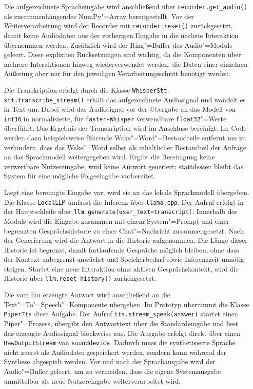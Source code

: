 Die aufgezeichnete Spracheingabe wird anschließend über \texttt{recorder.get\_audio()} als zusammenhängendes NumPy"=Array bereitgestellt. Vor der Weiterverarbeitung wird der Recorder mit \texttt{recorder.reset()} zurückgesetzt, damit keine Audiodaten aus der vorherigen Eingabe in die nächste Interaktion übernommen werden. Zusätzlich wird der Ring"=Buffer des Audio"=Moduls geleert. Diese expliziten Rücksetzungen sind wichtig, da die Komponenten über mehrere Interaktionen hinweg wiederverwendet werden, die Daten einer einzelnen Äußerung aber nur für den jeweiligen Verarbeitungsschritt benötigt werden.

Die Transkription erfolgt durch die Klasse \texttt{WhisperStt}. \texttt{stt.transcribe\_stream()} erhält das aufgezeichnete Audiosignal und wandelt es in Text um. Dabei wird das Audiosignal vor der Übergabe an das Modell von \texttt{int16} in normalisierte, für \texttt{faster-Whisper} verwendbare \texttt{float32}"=Werte überführt. Das Ergebnis der Transkription wird im Anschluss bereinigt. Im Code werden dazu beispielsweise führende Wake"=Word"=Bestandteile entfernt um zu verhindern, dass das Wake"=Word selbst als inhaltlicher Bestandteil der Anfrage an das Sprachmodell weitergegeben wird. Ergibt die Bereinigung keine verwertbare Nutzereingabe, wird keine Antwort generiert; stattdessen bleibt das System für eine mögliche Folgeeingabe vorbereitet.

Liegt eine bereinigte Eingabe vor, wird sie an das lokale Sprachmodell übergeben. Die Klasse \texttt{LocalLLM} umfasst die Inferenz über \texttt{llama.cpp}. Der Aufruf erfolgt in der Hauptschleife über \texttt{llm.generate(user\_text=transcript)}. Innerhalb des Moduls wird die Eingabe zusammen mit einem System"=Prompt und einer begrenzten Gesprächshistorie zu einer Chat"=Nachricht zusammengesetzt. Nach der Generierung wird die Antwort in die Historie aufgenommen. Die Länge dieser Historie ist begrenzt, damit fortlaufende Gespräche möglich bleiben, ohne dass der Kontext unbegrenzt anwächst und Speicherbedarf sowie Inferenzzeit unnötig steigen. Startet eine neue Interaktion ohne aktiven Gesprächskontext, wird die Historie über \texttt{llm.reset\_history()} zurückgesetzt.

Die vom \gls{llm} erzeugte Antwort wird anschließend an die Text"=To"=Speech"=Komponente übergeben. Im Prototyp übernimmt die Klasse \texttt{PiperTts} diese Aufgabe. Der Aufruf \texttt{tts.stream\_speak(answer)} startet einen Piper"=Prozess, übergibt den Antworttext über die Standardeingabe und liest das erzeugte Audiosignal blockweise aus. Die Ausgabe erfolgt direkt über einen \texttt{RawOutputStream} von \texttt{sounddevice}. Dadurch muss die synthetisierte Sprache nicht zuerst als Audiodatei gespeichert werden, sondern kann während der Synthese abgespielt werden. Vor und nach der Sprachausgabe wird der Audio"=Buffer geleert, um zu vermeiden, dass die eigene Systemausgabe unmittelbar als neue Nutzereingabe weiterverarbeitet wird.


